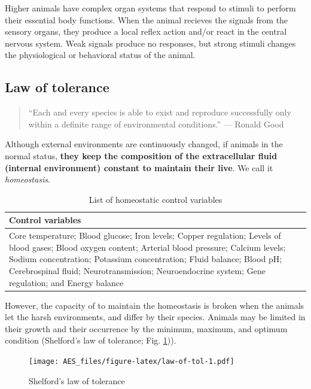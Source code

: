 \documentclass[]{book}
\begin{document}
Higher animals have complex organ systems that respond to stimuli to
perform their essential body functions. When the animal recieves the
signals from the sensory organs, they produce a local reflex action
and/or react in the central nervous system. Weak signals produce no
responses, but strong stimuli changes the physiological or behavioral
status of the animal.

\subsection{Law of tolerance}\label{law-of-tolerance}

\begin{quote}
``Each and every species is able to exist and reproduce successfully
only within a definite range of environmental conditions.'' --- Ronald
Good
\end{quote}

Although external environments are continuously changed, if animals in
the normal status, \textbf{they keep the composition of the
extracellular fluid (internal environment) constant to maintain their
live}. We call it \emph{homeostasis}.

\begin{table}

\caption{\label{tab:homeostasis}List of homeostatic control variables}
\centering
\begin{tabular}[t]{l}
\toprule
Control variables\\
\midrule
Core temperature; Blood glucose; Iron levels; Copper regulation; Levels of blood gases; Blood oxygen content; Arterial blood pressure; Calcium levels; Sodium concentration; Potassium concentration; Fluid balance; Blood pH; Cerebrospinal fluid; Neurotransmission; Neuroendocrine system; Gene regulation; and Energy balance\\
\bottomrule
\end{tabular}
\end{table}

However, the capacity of to maintain the homeostasis is broken when the
animals let the harsh environments, and differ by their species. Animals
may be limited in their growth and their occurrence by the minimum,
maximum, and optimum condition (Shelford's law of tolerance; Fig.
\ref{fig:law-of-tol})).

\begin{figure}
\centering
\texttt{[image: AES\_files/figure-latex/law-of-tol-1.pdf]}
\caption{\label{fig:law-of-tol}Shelford's law of tolerance}
\end{figure}
\end{document}
